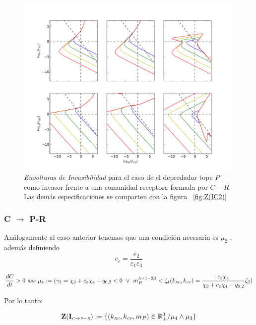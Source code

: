\begin{figure}
  \centering
  \includegraphics[width = 0.99\textwidth]{./Plots/Z(IC4)AcGrGr.pdf}
  \caption[Env $Z(IC4)$]{\emph{Envolturas de Invasibilidad} para el caso de el depredador tope $P$ como invasor frente a una comunidad receptora formada por $C-R$. Las dem\'as especificaciones se comparten con la figura ~\ref{fig:Z(IC2)}}
  \label{fig:Z(IC4)}
\end{figure}


\subsubsection{C $\to$ P-R}
An\'alogamente al caso anterior tenemos que una condici\'on necesaria es $\mu_2$ , adem\'as definiendo
\begin{equation}
  c_\varepsilon = \frac{\varepsilon_2}{\varepsilon_1\varepsilon_3}
\end{equation}

\begin{equation}
\frac{dC}{dt}  >0 \ sss \ \mu_4 := (\gamma_2 = \chi_3 + c_\varepsilon \chi_4 - q_{0,2} < 0 \ \lor \  m_P^{h + 1 - 2\beta} < \zeta_4(k_{\textit{\tiny RC}},k_{\textit{\tiny CP}}) = \frac{c_\varepsilon \chi_4}{\chi_3 + c_\varepsilon \chi_4 - q_{0,2}} \zeta_2 )
\end{equation}


Por lo tanto:

\begin{equation}
\mathbf{Z(I_{\textit{\tiny C} \to \textit{\tiny P}-\textit{\tiny R}})} := \{ (k_{\textit{\tiny RC}},k_{\textit{\tiny CP}},m_P) \in \mathbb{R}^3_+ / \mu_4 \land \mu_3 \}
\end{equation}

